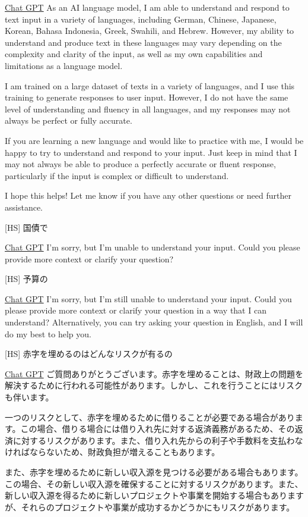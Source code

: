 \documentclass[
]{bxjsbook}
\theoremstyle{definition}
\theoremstyle{definition}
\theoremstyle{definition}
\theoremstyle{definition}
\theoremstyle{remark}
\begin{document}
\protect\hyperlink{chatgpt}{Chat GPT} As an AI language model, I am able to understand and respond to text input in a variety of languages, including German, Chinese, Japanese, Korean, Bahasa Indonesia, Greek, Swahili, and Hebrew. However, my ability to understand and produce text in these languages may vary depending on the complexity and clarity of the input, as well as my own capabilities and limitations as a language model.

I am trained on a large dataset of texts in a variety of languages, and I use this training to generate responses to user input. However, I do not have the same level of understanding and fluency in all languages, and my responses may not always be perfect or fully accurate.

If you are learning a new language and would like to practice with me, I would be happy to try to understand and respond to your input. Just keep in mind that I may not always be able to produce a perfectly accurate or fluent response, particularly if the input is complex or difficult to understand.

I hope this helps! Let me know if you have any other questions or need further assistance.

{[}HS{]} 国債で

\protect\hyperlink{chatgpt}{Chat GPT} I'm sorry, but I'm unable to understand your input. Could you please provide more context or clarify your question?

{[}HS{]} 予算の

\protect\hyperlink{chatgpt}{Chat GPT} I'm sorry, but I'm still unable to understand your input. Could you please provide more context or clarify your question in a way that I can understand? Alternatively, you can try asking your question in English, and I will do my best to help you.

{[}HS{]} 赤字を埋めるのはどんなリスクが有るの

\protect\hyperlink{chatgpt}{Chat GPT} ご質問ありがとうございます。赤字を埋めることは、財政上の問題を解決するために行われる可能性があります。しかし、これを行うことにはリスクも伴います。

一つのリスクとして、赤字を埋めるために借りることが必要である場合があります。この場合、借りる場合には借り入れ先に対する返済義務があるため、その返済に対するリスクがあります。また、借り入れ先からの利子や手数料を支払わなければならないため、財政負担が増えることもあります。

また、赤字を埋めるために新しい収入源を見つける必要がある場合もあります。この場合、その新しい収入源を確保することに対するリスクがあります。また、新しい収入源を得るために新しいプロジェクトや事業を開始する場合もありますが、それらのプロジェクトや事業が成功するかどうかにもリスクがあります。
\end{document}
